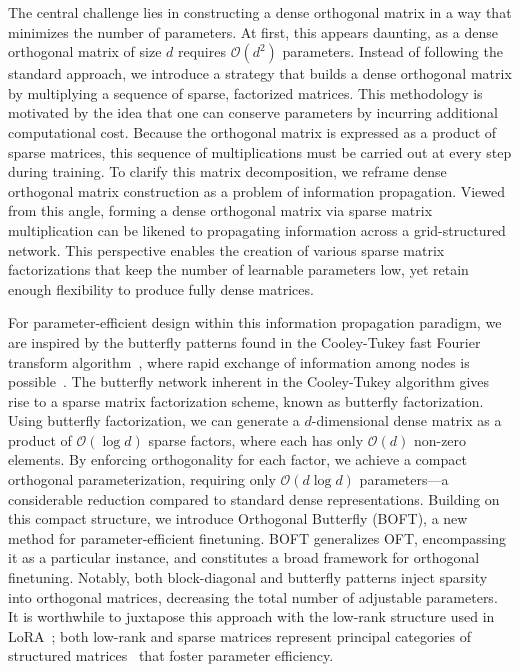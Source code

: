 The central challenge lies in constructing a dense orthogonal matrix in a way that minimizes the number of parameters. At first, this appears daunting, as a dense orthogonal matrix of size $d$ requires $\mathcal{O}(d^2)$ parameters. Instead of following the standard approach, we introduce a strategy that builds a dense orthogonal matrix by multiplying a sequence of sparse, factorized matrices. This methodology is motivated by the idea that one can conserve parameters by incurring additional computational cost. Because the orthogonal matrix is expressed as a product of sparse matrices, this sequence of multiplications must be carried out at every step during training. To clarify this matrix decomposition, we reframe dense orthogonal matrix construction as a problem of information propagation. Viewed from this angle, forming a dense orthogonal matrix via sparse matrix multiplication can be likened to propagating information across a grid-structured network. This perspective enables the creation of various sparse matrix factorizations that keep the number of learnable parameters low, yet retain enough flexibility to produce fully dense matrices.

For parameter-efficient design within this information propagation paradigm, we are inspired by the butterfly patterns found in the Cooley-Tukey fast Fourier transform algorithm~\cite{cooley1965algorithm}, where rapid exchange of information among nodes is possible~\cite{klasing1994broadcasting}. The butterfly network inherent in the Cooley-Tukey algorithm gives rise to a sparse matrix factorization scheme, known as butterfly factorization. Using butterfly factorization, we can generate a $d$-dimensional dense matrix as a product of $\mathcal{O}(\log d)$ sparse factors, where each has only $\mathcal{O}(d)$ non-zero elements. By enforcing orthogonality for each factor, we achieve a compact orthogonal parameterization, requiring only $\mathcal{O}(d\log d)$ parameters—a considerable reduction compared to standard dense representations. Building on this compact structure, we introduce Orthogonal Butterfly (BOFT), a new method for parameter-efficient finetuning. BOFT generalizes OFT, encompassing it as a particular instance, and constitutes a broad framework for orthogonal finetuning. Notably, both block-diagonal and butterfly patterns inject sparsity into orthogonal matrices, decreasing the total number of adjustable parameters. It is worthwhile to juxtapose this approach with the low-rank structure used in LoRA~\cite{hulora2022}; both low-rank and sparse matrices represent principal categories of structured matrices~\cite{candes2011robust} that foster parameter efficiency.


